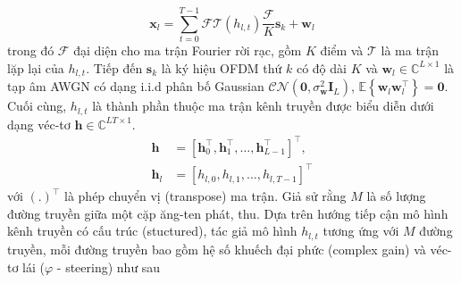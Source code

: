 
\begin{equation}
    \mathbf{x}_{l}=\sum_{t=0}^{T-1} \mathcal{F} \mathcal{T}\left(h_{l, t}\right) \frac{\mathcal{F}}{K} \mathbf{s}_{k}+\mathbf{w}_{l}
\end{equation}
trong đó $\mathcal{F}$ đại diện cho ma trận Fourier rời rạc, gồm $K$ điểm và $\mathcal{T}$ là ma trận lặp lại của $h_{l, t}$. Tiếp đến $\mathbf{s}_{k}$ là ký hiệu OFDM thứ $k$ có độ dài $K$ và $\mathbf{w}_{l} \in \mathbb{C}^{L \times 1}$ là tạp âm AWGN có dạng i.i.d phân bố Gaussian $\mathcal{C} \mathcal{N}\left(\mathbf{0}, \sigma_{\mathbf{w}}^{2} \mathbf{I}_L\right)$, $\mathbb{E}\left\{\mathbf{w}_{l} \mathbf{w}_{l}^{\top}\right\}=\mathbf{0}$. 
Cuối cùng, $h_{l, t}$ là thành phần thuộc ma trận kênh truyền được biểu diễn dưới dạng véc-tơ $\mathbf{h} \in \mathbb{C}^{L T \times 1}$.
\begin{equation}
    \label{eq:1}
    \begin{aligned} 
        \mathbf{h} &=\left[\mathbf{h}_{0}^{\top}, \mathbf{h}_{1}^{\top}, \ldots, \mathbf{h}_{L - 1 }^{\top}\right]^{\top}, \\ \mathbf{h}_{l} &=\left[h_{l, 0}, h_{l, 1}, \ldots, h_{l, T - 1 }\right]^{\top}
    \end{aligned}
\end{equation}
với $(.)^\top$ là phép chuyển vị (transpose) ma trận. Giả sử rằng $M$ là số lượng đường truyền giữa một cặp ăng-ten phát, thu. Dựa trên hướng tiếp cận mô hình kênh truyền có cấu trúc (stuctured), tác giả mô hình $h_{l, t}$ tương ứng với $M$ đường truyền, mỗi đường truyền bao gồm hệ số khuếch đại phức (complex gain) và véc-tơ lái ($\varphi$ - steering) như sau


